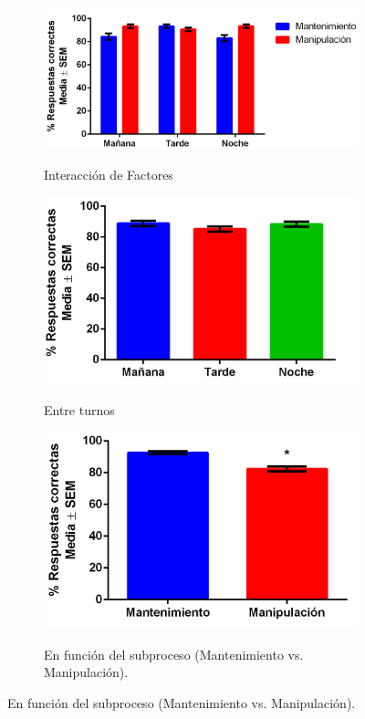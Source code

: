 \documentclass[12pt,letterpaper,final]{article}
\begin{document}
\begin{figure}[h]
 \begin{footnotesize}
  \begin{subfigure}[a]{.4\textwidth}	
	\centering
	\caption{Interacción de Factores}
	\includegraphics[scale=0.6]{graficas/RC_intr.png}	
	\label{Sub:rcint}
	\end{subfigure}
    \hfill
    \begin{subfigure}[a]{\textwidth}	
	\centering
	\caption{Entre turnos}
	\includegraphics[scale=0.6]{graficas/RC_Tur.png}	
	\label{Sub:rctur}
	\end{subfigure}
	
	\begin{subfigure}[b]{0.9\textwidth}	
	\centering
	\caption{En función del subproceso (Mantenimiento vs. Manipulación).}
	\includegraphics[scale=0.8]{graficas/RC_Tar.png}
	\label{Sub:rctar}
	\end{subfigure}
 \end{footnotesize}
	

\end{figure}
\end{document}
